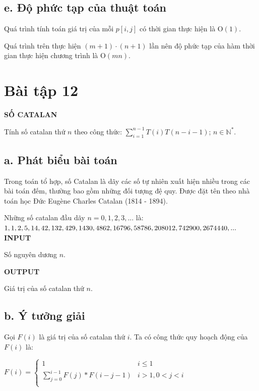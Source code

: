 \documentclass[12pt, a4paper, fleqn]{article}
\begin{document}
	\subsection*{e. Độ phức tạp của thuật toán}
	
	Quá trình tính toán giá trị của mỗi $p[i, j]$ có thời gian thực hiện là O$(1)$.
	
	Quá trình trên thực hiện $(m + 1) \cdot (n + 1)$ lần nên độ phức tạp của hàm thời gian thực hiện chương trình là O$(mn)$.
	
	\clearpage
	
	\section*{Bài tập 12}
	
	
	\textbf{SỐ CATALAN}
	
	Tính số catalan thứ $n$ theo công thức: $\displaystyle \sum_{i = 1}^{n - 1} T(i)T(n - i - 1)$; $n \in \mathbb{N^*}$.
	
	\subsection*{a. Phát biểu bài toán}
	
	Trong toán tổ hợp, số Catalan là dãy các số tự nhiên xuất hiện nhiều trong các bài toán đếm, thường bao gồm những đối tượng đệ quy. Được đặt tên theo nhà toán học Đức Eugène Charles Catalan (1814 - 1894).
	
	Những số catalan đầu dãy $n = 0, 1, 2, 3, ...$ là: $1, 1, 2, 5, 14, 42, 132, 429, 1430, 4862, 16796, \\
	58786, 208012, 742900, 2674440, ...$ \\
	
	\textbf{INPUT}
	
	Số nguyên dương $n$.
	
	\textbf{OUTPUT}
	
	Giá trị của số catalan thứ $n$.
	
	\subsection*{b. Ý tưởng giải}
	
	Gọi $F(i)$ là giá trị của số catalan thứ $i$. Ta có công thức quy hoạch động của $F(i)$ là:
	
	$F(i) = {
		\begin{cases}
		1 & {i \leq 1} \\
		\displaystyle \sum_{j = 0}^{i - 1} F(j) * F(i - j - 1) & {i > 1, 0 < j < i} \\
		\end{cases}
	}$
	
\end{document}
